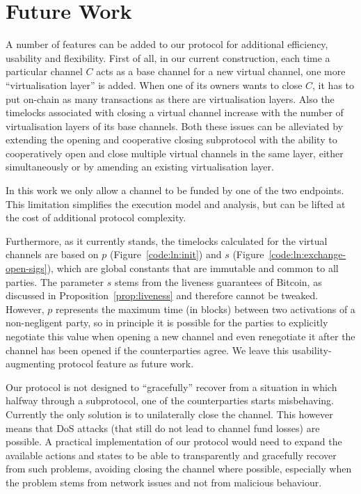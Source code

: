 \section{Future Work}
\label{sec:further-future-work}
  A number of features can be added to our protocol for additional efficiency,
  usability and flexibility. First of all, in our current construction, each
  time a particular channel $C$ acts as a base
  channel for a new virtual channel, one more ``virtualisation layer'' is added. When
  one of its owners wants to close $C$, it has to put on-chain as many
  transactions as there are virtualisation layers. Also the timelocks associated
  with closing a virtual channel increase with the number of virtualisation
  layers of its base channels. Both these issues can be alleviated by extending
  the opening and cooperative closing subprotocol with the ability to
  cooperatively open and close multiple virtual channels in the same layer,
  either simultaneously or by amending an existing virtualisation layer.

  In this work we only allow a channel to be funded by one of the two endpoints.
  This limitation simplifies the execution model and analysis, but can be lifted
  at the cost of additional protocol complexity.

  Furthermore, as it currently stands, the
  timelocks calculated for the virtual channels are based on $p$
  (Figure~\ref{code:ln:init}) and $s$ (Figure~\ref{code:ln:exchange-open-sigs}),
  which are global constants that are immutable and common to all parties. The
  parameter $s$ stems from the liveness guarantees of Bitcoin, as discussed in
  Proposition~\ref{prop:liveness} and therefore cannot be tweaked. However, $p$
  represents the maximum time (in blocks) between two activations of a
  non-negligent party, so in principle it is possible for the parties to
  explicitly negotiate this value when opening a new channel and even
  renegotiate it after the channel has been opened if the counterparties agree.
  We leave this usability-augmenting protocol feature as future work.

  Our protocol is not designed to ``gracefully'' recover from a situation in
  which halfway through a subprotocol, one of the counterparties starts
  misbehaving. Currently the only solution is to unilaterally close the channel.
  This however means that DoS attacks (that still do not lead to channel fund
  losses) are possible. A practical implementation of our protocol would need to
  expand the available actions and states to be able to transparently and
  gracefully recover from such problems, avoiding closing the channel where
  possible, especially when the problem stems from network issues and not from
  malicious behaviour.

